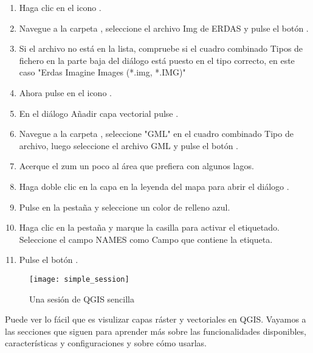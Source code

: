 
\begin{enumerate}
\item Haga clic en el icono .
\item Navegue a la carpeta , seleccione el
archivo Img de ERDAS  y pulse el botón .
\item Si el archivo no está en la lista, compruebe si el cuadro combinado Tipos de fichero en la
parte baja del diálogo está puesto en el tipo correcto, en este caso "Erdas Imagine
Images (*.img, *.IMG)"
\item Ahora pulse en el icono .
\item En el diálogo Añadir capa vectorial pulse .
\item Navegue a la carpeta , seleccione "GML"
en el cuadro combinado Tipo de archivo, luego seleccione
el archivo GML  y pulse el botón .
\item Acerque el zum un poco al área que prefiera con algunos lagos.
\item Haga doble clic en la capa  en la leyenda del mapa para abrir el 
diálogo .
\item Pulse en la pestaña  y seleccione un color de relleno azul.
\item Haga clic en la pestaña  y marque la casilla  
para activar el etiquetado. Seleccione el campo NAMES como Campo que contiene la etiqueta.
\item Pulse el botón .
\end{enumerate} 

\begin{figure}[ht]
   \begin{center}
   \caption{Una sesión de QGIS sencilla \nixcaption}\label{fig:simple_session}\smallskip
   \texttt{[image: simple\_session]}
\end{center}  
\end{figure}

Puede ver lo fácil que es visulizar capas ráster y vectoriales en 
QGIS. Vayamos a las secciones que siguen para aprender más sobre las 
funcionalidades disponibles, características y configuraciones y sobre cómo usarlas.
